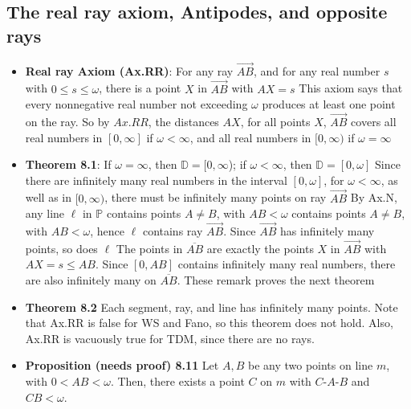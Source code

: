 \documentclass{report}
\begin{document}
    \pagebreak 
    \subsection{The real ray axiom, Antipodes, and opposite rays}
    \begin{itemize}
                \item \textbf{Real ray Axiom (Ax.RR)}: For any ray $ \overrightarrow{AB}$, and for any real number $s $ with $0 \leq s \leq \omega$, there is a point $X$ in $\overrightarrow{AB}$ with $AX = s$
            This axiom says that every nonnegative real number not exceeding $\omega$ produces at least one point on the ray.
            \bigbreak \noindent 
            So by $Ax.RR$, the distances $AX$, for all points $X$, $ \overrightarrow{AB}$ covers all real numbers in $[0,\infty]$ if $\omega < \infty$, and all real numbers in $[0,\infty) $ if $\omega = \infty $
        \item \textbf{Theorem 8.1}: If $\omega = \infty$, then $\mathbb{D} = [0,\infty$); if $\omega < \infty$, then $\mathbb{D} = [0,\omega] $
            \bigbreak \noindent 
            Since there are infinitely many real numbers in the interval $[0,\omega]$, for $\omega < \infty$, as well as in $[0,\infty)$, there must be infinitely many points on ray $\overrightarrow{AB}$
            \bigbreak \noindent 
            By Ax.N, any line $\ell$ in $\mathbb{P}$ contains points $A \ne B$, with $AB < \omega$ contains points $A \ne B$, with $AB < \omega$, hence $\ell$ contains ray $\overrightarrow{AB}$. Since $\overrightarrow{AB}$ has infinitely many points, so does $\ell $
            \bigbreak \noindent 
            The points in $\overline{AB}$ are exactly the points $X$ in $\overrightarrow{AB}$ with $AX = s \leq AB$. Since $[0,AB]$ contains infinitely many real numbers, there are also infinitely many on $\overline{AB}$. These remark proves the next theorem
        \item \textbf{Theorem 8.2} Each segment, ray, and line has infinitely many points.
            \bigbreak \noindent 
            Note that Ax.RR is false for WS and Fano, so this theorem does not hold. Also, Ax.RR is vacuously true for TDM, since there are no rays.
        \item \textbf{Proposition (needs proof) 8.11} Let $A,B$ be any two points on line $m$, with $0 < AB <\omega$. Then, there exists a point $C$ on $m$ with $ C\text{-}A\text{-}B$ and $ CB < \omega$.

\end{itemize}
\end{document}
